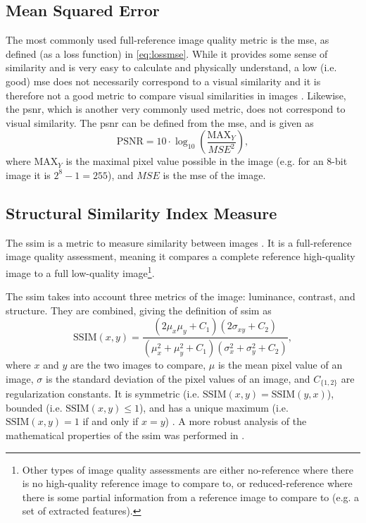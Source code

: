 \subsection{Mean Squared Error}
\label{sec:method:metrics:mse}
The most commonly used full-reference image quality metric is the \acrfull{mse}, as defined (as a loss function) in \cref{eq:lossmse}. While it provides some sense of similarity and is very easy to calculate and physically understand, a low (i.e. good) \acrshort{mse} does not necessarily correspond to a visual similarity and it is therefore not a good metric to compare visual similarities in images \cite{413502,477498}. Likewise, the \acrfull{psnr}, which is another very commonly used metric, does not correspond to visual similarity. The \acrshort{psnr} can be defined from the \acrshort{mse}, and is given as \cite{477498}
\begin{equation}
    \label{eq:psnr}
    \text{PSNR} = 10 \cdot \log_{10} \left( \frac{\text{MAX}_Y}{MSE^2} \right),
\end{equation}
where $\text{MAX}_Y$ is the maximal pixel value possible in the image (e.g. for an 8-bit image it is $2^8-1=255$), and $MSE$ is the \acrshort{mse} of the image. 

\subsection{Structural Similarity Index Measure}
The \acrfull{ssim} is a metric to measure similarity between images \cite{ssim}. It is a full-reference image quality assessment, meaning it compares a complete reference high-quality image to a full low-quality image\footnote{Other types of image quality assessments are either no-reference where there is no high-quality reference image to compare to, or reduced-reference where there is some partial information from a reference image to compare to (e.g. a set of extracted features)\cite{ssim}. }. 


The \acrshort{ssim} takes into account three metrics of the image: luminance, contrast, and structure. They are combined, giving the definition of \acrshort{ssim} as \cite{ssim}
\begin{equation}
    \label{eq:ssim}
    \text{SSIM}\left(x,y\right) = \frac{\left( 2\mu_x \mu_y + C_1 \right) \left( 2\sigma_{xy} + C_2 \right)}{\left( \mu_x^2 + \mu_y^2 + C_1 \right) \left( \sigma_x^2 + \sigma_y^2 + C_2 \right)},
\end{equation}
where $x$ and $y$ are the two images to compare, $\mu$ is the mean pixel value of an image, $\sigma$ is the standard deviation of the pixel values of an image, and $C_{\{1,2\}}$ are regularization constants. It is symmetric (i.e. $\text{SSIM}\left(x,y\right) = \text{SSIM}\left(y,x\right)$), bounded (i.e. $\text{SSIM}\left(x,y\right) \leq 1$), and has a unique maximum (i.e. $\text{SSIM}\left(x,y\right) = 1$ if and only if $x = y$) \cite{ssim}. A more robust analysis of the mathematical properties of the \acrshort{ssim} was performed in \cite{6059504}.

